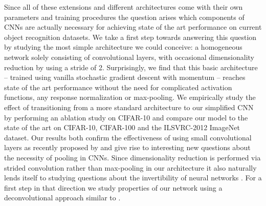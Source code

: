\documentclass{article} \usepackage{iclr2015,times}
\begin{document}
Since all of these extensions and different architectures come with
their own parameters and training procedures the question arises which
components of CNNs are actually  necessary for achieving
state of the art performance on current object recognition datasets.
We take a first step towards answering this question by
studying the most simple architecture we could conceive: a homogeneous network
solely consisting of convolutional layers, with occasional
dimensionality reduction by using a stride of 2. Surprisingly, we
find that this basic architecture -- trained using vanilla stochastic
gradient descent with momentum -- reaches state of the art
performance without the need
for complicated activation functions, any response normalization or max-pooling. We empirically study
the effect of transitioning from a more standard architecture to our
simplified CNN by performing an ablation study on CIFAR-10 and compare
our model to the state of the art on CIFAR-10, CIFAR-100 and the
ILSVRC-2012 ImageNet dataset. Our results both confirm the effectiveness
of using small convolutional layers as recently proposed by \citet{VGG_2014} and give rise to interesting new
questions about the necessity of pooling in CNNs. Since dimensionality
reduction is performed via strided convolution rather than max-pooling in our
architecture it also naturally lends itself to studying questions about the
invertibility of neural networks \citep{Estrach_2014}. For a first step in
that direction we study properties of our network using a
deconvolutional approach similar to \citet{Zeiler_ECCV2014}.
\end{document}
